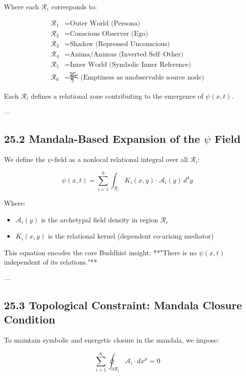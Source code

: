 \documentclass[12pt]{article}
\begin{document}
\begin{enumerate}
Where each $\mathcal{R}_i$ corresponds to:

\begin{align*}
\mathcal{R}_1 &= \text{Outer World (Persona)} \\
\mathcal{R}_2 &= \text{Conscious Observer (Ego)} \\
\mathcal{R}_3 &= \text{Shadow (Repressed Unconscious)} \\
\mathcal{R}_4 &= \text{Anima/Animus (Inverted Self–Other)} \\
\mathcal{R}_5 &= \text{Inner World (Symbolic Inner Reference)} \\
\mathcal{R}_6 &= \textbf{སྟོང} \text{ (Emptiness as unobservable source node)}
\end{align*}

Each $\mathcal{R}_i$ defines a relational zone contributing to the emergence of $\psi(x,t)$.

---

\subsection*{25.2 Mandala-Based Expansion of the $\psi$ Field}

We define the $\psi$-field as a nonlocal relational integral over all $\mathcal{R}_i$:

\[
\psi(x,t) = \sum_{i=1}^6 \int_{\mathcal{R}_i} K_i(x, y) \cdot \mathcal{A}_i(y) \, d^4y
\]

Where:

\begin{itemize}
  \item $\mathcal{A}_i(y)$ is the archetypal field density in region $\mathcal{R}_i$
  \item $K_i(x, y)$ is the relational kernel (dependent co-arising mediator)
\end{itemize}

This equation encodes the core Buddhist insight:  
**"There is no $\psi(x,t)$ independent of its relations."**

---

\subsection*{25.3 Topological Constraint: Mandala Closure Condition}

To maintain symbolic and energetic closure in the mandala, we impose:

\[
\sum_{i=1}^6 \oint_{\partial \mathcal{R}_i} \mathcal{A}_i \cdot dx^\mu = 0
\]


\end{enumerate}
\end{document}
